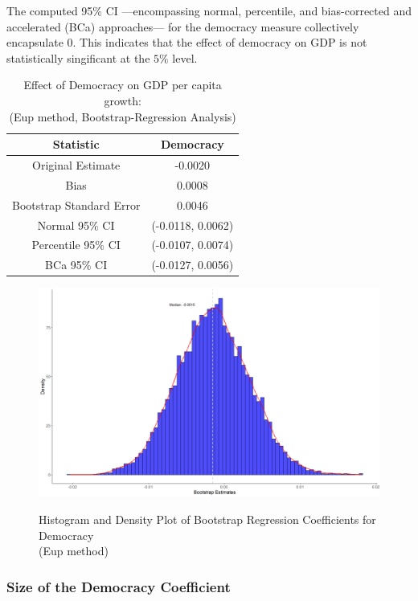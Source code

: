 The computed 95\% \ac{CI} —encompassing normal, percentile, and bias-corrected and accelerated (BCa) approaches— for the democracy measure collectively encapsulate 0. This indicates that the effect of democracy on GDP is not statistically singificant at the $5\%$ level. 


\begin{table}[htb]
\caption{Effect of Democracy on GDP per capita growth: \\
(\ac{Eup} method, Bootstrap-Regression Analysis)}
\label{eup_results_boostrap}
\small
\centering
\begin{tabular}{cc}
\hline
Statistic & Democracy \\
\hline 
Original Estimate & -0.0020 \\
Bias & 0.0008 \\
Bootstrap Standard Error & 0.0046 \\
Normal 95\% CI & (-0.0118, 0.0062) \\
Percentile 95\% CI & (-0.0107, 0.0074) \\
BCa 95\% CI & (-0.0127, 0.0056) \\
\hline
\end{tabular}
\end{table}


\begin{figure}[htb]
  \caption{Histogram and Density Plot of Bootstrap Regression Coefficients for Democracy \\
  (\ac{Eup} method)}
  \centering
  \includegraphics[width=\textwidth]{Images/hist_eup.png}
  \label{fig:image2}
\end{figure}


\subsubsection{Size of the Democracy Coefficient}

